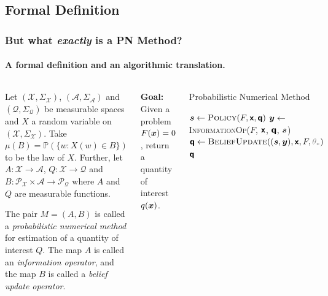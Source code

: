 \documentclass[10pt,usepdftitle=false,aspectratio=169]{beamer}
\begin{document}
\begin{frame}
\begin{columns}[c,totalwidth=\textwidth]
	\end{columns}

\end{frame}

\subsection{Formal Definition}

\begin{frame}\frametitle{But what \textit{exactly} is a PN Method?}
	\framesubtitle{A formal definition and an algorithmic translation.}

	\begin{columns}[totalwidth=\textwidth]

		\begin{definition}
			Let \((\mathcal{X}, \Sigma_\mathcal{X})\),
			\((\mathcal{A}, \Sigma_\mathcal{A})\) and \((\mathcal{Q},
			\Sigma_\mathcal{Q})\) be measurable spaces and \(X\) a random variable on
			\((\mathcal{X}, \Sigma_\mathcal{X})\). Take
			\(\mu(B)=\mathbb{P}(\{w : X(w) \in B\})\) to be the law of \(X\). Further, let
			\(A:\mathcal{X} \rightarrow \mathcal{A}\), \(Q: \mathcal{X}
			\rightarrow \mathcal{Q}\) and \(B: \mathcal{P}_\mathcal{X} \times
			\mathcal{A} \rightarrow \mathcal{P}_\mathcal{Q}\) where \(A\) and
			\(Q\) are measurable functions.
			\vspace{1.5ex}

			The pair \(M=(A,B)\) is called a \emph{probabilistic numerical method} for estimation of a quantity of interest
			\(Q\). The map \(A\) is called an \emph{information operator}, and the map \(B\) is called a
			\emph{belief update operator}.
		\end{definition}



		\textbf{Goal:} Given a problem \(F({\bm{x}}) = 0\), return a quantity of interest \(q({\bm{x}})\).

		\setcounter{algorithm}{0}
		\begin{algorithm}[H]
			\caption{Probabilistic Numerical Method}
			\small
			\begin{algorithmic}[1]
				\State \({{\bm{s}}} \gets \textsc{Policy}(F, {\bm{\mathsf{x}}}, {\bm{\mathsf{q}}})\)
				\State \({{\bm{y}}} \gets\) \textsc{InformationOp}($F$, ${\bm{\mathsf{x}}}$, ${\bm{\mathsf{q}}}$, ${\bm{s}}$)
				\State \(\rvq \gets \textsc{BeliefUpdate}((\vs, \vy), \rvx, F,
				{\color{gray}\theta_*})\)
				\EndWhile
				\State \Return ${\bm{\mathsf{q}}}$
				\EndProcedure
			\end{algorithmic}
		\end{algorithm}

	\end{columns}

\end{frame}
\end{document}
